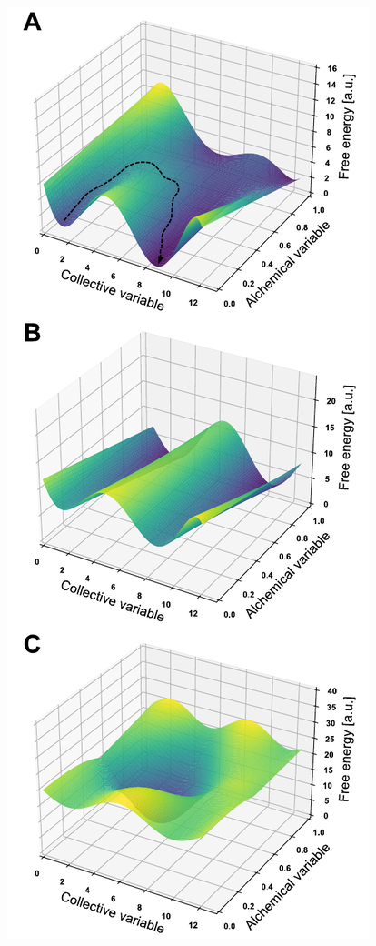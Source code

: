\documentclass[9pt,bestpractices,pubversion]{livecoms}
\begin{document}
\begin{figure}
    \includegraphics[width=0.88\columnwidth]{paper/figures/fig_configurational_sampling/FES_scenarios_path.pdf}

\end{figure}
\end{document}
